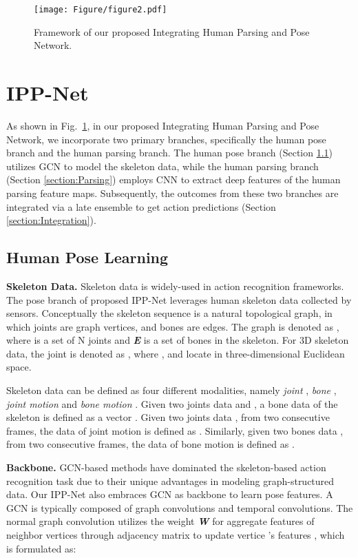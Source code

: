 \documentclass[runningheads]{llncs}
\begin{document}
\begin{figure}[t]
\texttt{[image: Figure/figure2.pdf]}
\caption{Framework of our proposed Integrating Human Parsing and Pose Network.} \label{network}
\end{figure}

\section{IPP-Net}
As shown in Fig.~\ref{network}, in our proposed Integrating Human Parsing and Pose Network, we incorporate two primary branches, specifically the human pose branch and the human parsing branch. The human pose branch (Section \ref{section:Pose}) utilizes GCN to model the skeleton data, while the human parsing branch (Section \ref{section:Parsing}) employs CNN to extract deep features of the human parsing feature maps. Subsequently, the outcomes from these two branches are integrated via a late ensemble to get action predictions (Section \ref{section:Integration}). 

\subsection{Human Pose Learning}
\label{section:Pose}
\textbf{Skeleton Data.} Skeleton data is widely-used in action recognition frameworks. The pose branch of proposed IPP-Net leverages human skeleton data collected by sensors. Conceptually the skeleton sequence is a natural topological graph, in which joints are graph vertices, and bones are edges. The graph is denoted as , where  is a set of N joints and \textit{\textbf{E}} is a set of bones in the skeleton. For 3D skeleton data, the joint  is denoted as , where ,  and  locate  in three-dimensional Euclidean space.

Skeleton data can be defined as four different modalities, namely \textit{joint} , \textit{bone} , \textit{joint motion}  and \textit{bone motion} . Given two joints data  and , a bone data of the skeleton is defined as a vector . Given two joints data ,  from two consecutive frames, the data of joint motion is defined as . Similarly, given two bones data ,  from two consecutive frames, the data of bone motion is defined as .

\textbf{Backbone.} GCN-based methods have dominated the skeleton-based action recognition task due to their unique advantages in modeling graph-structured data. Our IPP-Net also embraces GCN as backbone to learn pose features. A GCN is typically composed of graph convolutions and temporal convolutions. The normal graph convolution utilizes the weight \textit{\textbf{W}} for aggregate features of neighbor vertices through adjacency matrix  to update vertice ’s features , which is formulated as:
\end{document}

